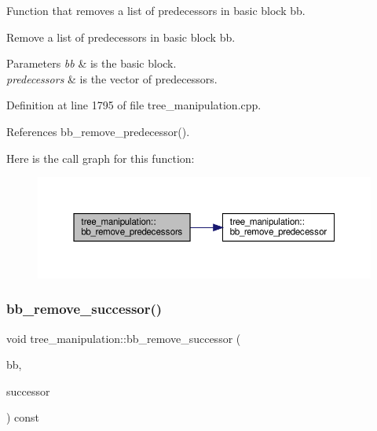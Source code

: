 Function that removes a list of predecessors in basic block bb. 

Remove a list of predecessors in basic block bb.


\begin{DoxyParams}{Parameters}
{\em bb} & is the basic block. \\
\hline
{\em predecessors} & is the vector of predecessors. \\
\hline
\end{DoxyParams}


Definition at line 1795 of file tree\+\_\+manipulation.\+cpp.



References bb\+\_\+remove\+\_\+predecessor().

Here is the call graph for this function\+:
\nopagebreak
\begin{figure}[H]
\begin{center}
\leavevmode
\includegraphics[width=350pt]{d0/d99/classtree__manipulation_afd343f5c3f8f33b1af6f9fc68c9639fe_cgraph}
\end{center}
\end{figure}
\mbox{\label{classtree__manipulation_a08e3efb88fb38b6274efd03c070ac9b4}} 
\subsubsection{\texorpdfstring{bb\+\_\+remove\+\_\+successor()}{bb\_remove\_successor()}}
{\footnotesize\ttfamily void tree\+\_\+manipulation\+::bb\+\_\+remove\+\_\+successor (\begin{DoxyParamCaption}\item[{bloc\+Ref \&}]{bb,  }\item[{const unsigned int \&}]{successor }\end{DoxyParamCaption}) const}



